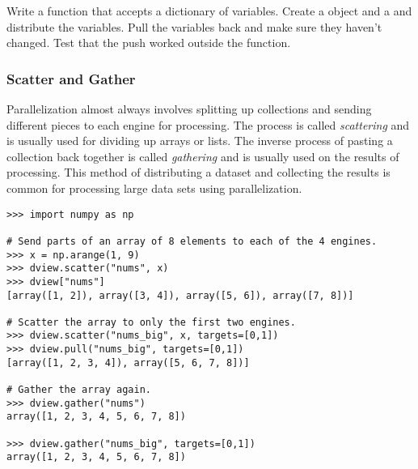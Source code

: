 %

\begin{problem}
Write a function  that accepts a dictionary of variables.
Create a  object and a  and distribute the variables.
Pull the variables back and make sure they haven't changed.
Test that the push worked outside the function.
\end{problem}

\subsubsection*{Scatter and Gather} %

Parallelization almost always involves splitting up collections and sending different pieces to each engine for processing.
The process is called \emph{scattering} and is usually used for dividing up arrays or lists.
The inverse process of pasting a collection back together is called \emph{gathering} and is usually used on the results of processing.
This method of distributing a dataset and collecting the results is common for processing large data sets using parallelization.

\begin{lstlisting}
>>> import numpy as np

# Send parts of an array of 8 elements to each of the 4 engines.
>>> x = np.arange(1, 9)
>>> dview.scatter("nums", x)
>>> dview["nums"]
[array([1, 2]), array([3, 4]), array([5, 6]), array([7, 8])]

# Scatter the array to only the first two engines.
>>> dview.scatter("nums_big", x, targets=[0,1])
>>> dview.pull("nums_big", targets=[0,1])
[array([1, 2, 3, 4]), array([5, 6, 7, 8])]

# Gather the array again.
>>> dview.gather("nums")
array([1, 2, 3, 4, 5, 6, 7, 8])

>>> dview.gather("nums_big", targets=[0,1])
array([1, 2, 3, 4, 5, 6, 7, 8])
\end{lstlisting}

